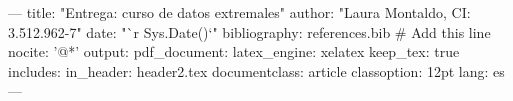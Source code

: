 ---
title: "Entrega: curso de datos extremales"
author: "Laura Montaldo, CI: 3.512.962-7"
date: "`r Sys.Date()`"
bibliography: references.bib  # Add this line
nocite: '@*'
output:
  pdf_document:
    latex_engine: xelatex
    keep_tex: true
    includes:
      in_header: header2.tex
documentclass: article
classoption: 12pt
lang: es
---

\usepackage{makeidx}
\makeindex
\usepackage{graphicx}
\usepackage{tikz}
\usepackage{atbegshi}

